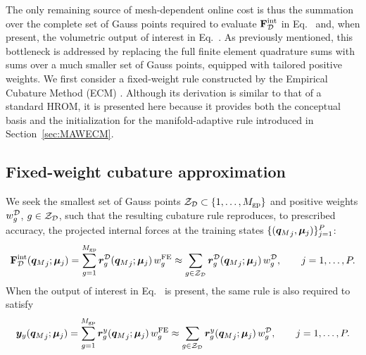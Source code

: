 \documentclass[preprint,10pt]{elsarticle}  %
\begin{document}
 The only remaining source of mesh-dependent online cost is thus   the
summation over the complete set of Gauss points required to evaluate
\(\displaystyle \mathbf{F}^{\mathrm{int}}_{\mathcal{D}}\) in Eq.~ and,
when present, the volumetric output of interest in
Eq.~. As previously mentioned, this bottleneck is addressed
by replacing the full finite element quadrature sums with sums over a
much smaller set of Gauss points, equipped with tailored positive
weights. We first consider a fixed-weight rule constructed by the
Empirical Cubature Method (ECM)
\cite{hernandez2017dimensional,hernandez2020multiscale}. Although its
derivation is similar to that of a standard HROM, it is presented here
because it provides both the conceptual basis and the initialization for
the manifold-adaptive rule  introduced in
Section~\ref{sec:MAWECM}.

%
%

\subsection{Fixed-weight cubature approximation  }
\label{sec:fixedweight_cubature}

We seek the smallest set of Gauss points $\mathcal{Z}_{\mathcal{D}}\subset\{1,\ldots,M_{\mathrm{gp}}\}$
and positive weights \(w^{\mathcal{D}}_{g}\), \(g\in\mathcal{Z}_{\mathcal{D}}\), such that the resulting
cubature rule reproduces, to prescribed accuracy, the projected
internal forces at the training states
\(\{({\bm{q}_M}_j,\bm{\mu}_j)\}_{j=1}^{P}\):
\begin{equation}
\label{eq:approx_ECMfixed1}
\displaystyle \mathbf{F}^{\mathrm{int}}_{\mathcal{D}}({\bm{q}_M}_j;\bm{\mu}_j)
=
\sum_{g=1}^{M_{\mathrm{gp}}}
\bm{r}^{\mathcal{D}}_{g}({\bm{q}_M}_j;\bm{\mu}_j)\,w^{\mathrm{FE}}_{g}
\approx
\sum_{g\in\mathcal{Z}_{\mathcal{D}}}
\bm{r}^{\mathcal{D}}_{g}({\bm{q}_M}_j;\bm{\mu}_j)\,w^{\mathcal{D}}_{g},
\qquad
j=1,\ldots,P .
\end{equation}
When the   output of interest in
Eq.~ is present, the same rule is
also required to satisfy
\begin{equation}
\label{eq:approxOUTPUT}
\bm{y}_{{y}}({\bm{q}_M}_j;\bm{\mu}_j)
=
\sum_{g=1}^{M_{\mathrm{gp}}}
\bm{r}^{{y}}_{g}({\bm{q}_M}_j;\bm{\mu}_j)\,w^{\mathrm{FE}}_{g}
\approx
\sum_{g\in\mathcal{Z}_{\mathcal{D}}}
\bm{r}^{{y}}_{g}({\bm{q}_M}_j;\bm{\mu}_j)\,w^{\mathcal{D}}_{g},
\qquad
j=1,\ldots,P .
\end{equation}
\end{document}
